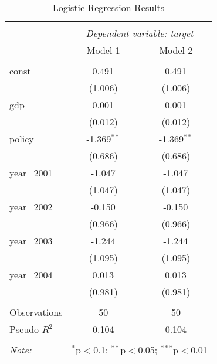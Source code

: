 \begin{table}[!htbp] \centering
  \caption{Logistic Regression Results}
\begin{tabular}{@{\extracolsep{5pt}}lcc}
\\[-1.8ex]\hline
\hline \\[-1.8ex]
& \multicolumn{2}{c}{\textit{Dependent variable: target}} \
\cr \cline{2-3}
\\[-1.8ex] & \multicolumn{1}{c}{Model 1} & \multicolumn{1}{c}{Model 2}  \\
\hline \\[-1.8ex]
 const & 0.491$^{}$ & 0.491$^{}$ \\
& (1.006) & (1.006) \\
 gdp & 0.001$^{}$ & 0.001$^{}$ \\
& (0.012) & (0.012) \\
 policy & -1.369$^{**}$ & -1.369$^{**}$ \\
& (0.686) & (0.686) \\
 year_2001 & -1.047$^{}$ & -1.047$^{}$ \\
& (1.047) & (1.047) \\
 year_2002 & -0.150$^{}$ & -0.150$^{}$ \\
& (0.966) & (0.966) \\
 year_2003 & -1.244$^{}$ & -1.244$^{}$ \\
& (1.095) & (1.095) \\
 year_2004 & 0.013$^{}$ & 0.013$^{}$ \\
& (0.981) & (0.981) \\
\hline \\[-1.8ex]
 Observations & 50 & 50 \\
 Pseudo $R^2$ & 0.104 & 0.104 \\
\hline
\hline \\[-1.8ex]
\textit{Note:} & \multicolumn{2}{r}{$^{*}$p$<$0.1; $^{**}$p$<$0.05; $^{***}$p$<$0.01} \\
\end{tabular}
\end{table}
